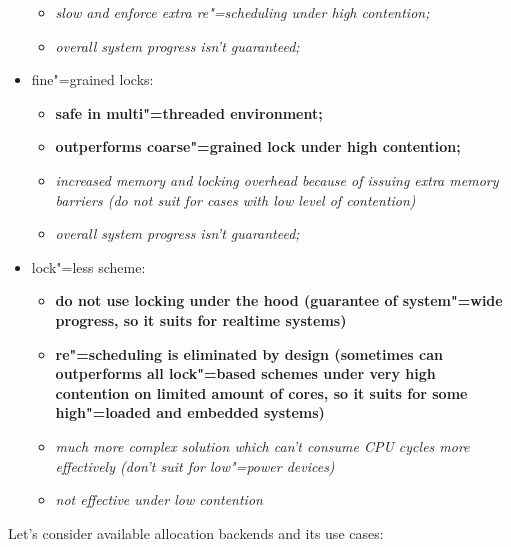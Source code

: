 \documentclass[10pt, a5paper]{article}
\begin{document}
\begin{itemize}
\begin{itemize}
  \item \emph{slow and enforce extra re"=scheduling under high contention;}
  \item \emph{overall system progress isn't guaranteed;}
\end{itemize}
  \item fine"=grained locks:\begin{itemize}
  \item \textbf{safe in multi"=threaded environment;}
  \item \textbf{outperforms coarse"=grained lock under high \linebreak contention;}
  \item \emph{increased memory and locking overhead because of issuing extra memory barriers (do not suit for cases with low level of contention)}
  \item \emph{overall system progress isn't guaranteed;}
\end{itemize}
  \item lock"=less scheme:\begin{itemize}
  \item \textbf{do not use locking under the hood (guarantee of system"=wide progress, so it suits for realtime systems)}
  \item \textbf{re"=scheduling is eliminated by design (sometimes can outperforms all lock"=based schemes under very high contention on limited amount of cores, so it suits for some high"=loaded and embedded systems)}
  \item \emph{much more complex solution which can't consume CPU cycles more effectively (don't suit for low"=power devices)}
  \item \emph{not effective under low contention}
\end{itemize}
\end{itemize}

Let's consider available allocation backends and its use cases:
\end{document}
